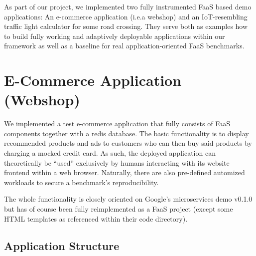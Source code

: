 \documentclass[../main.tex]{subfiles}
\begin{document}
As part of our project, we implemented two fully instrumented FaaS based demo applications:
An e-commerce application (i.e.\@ a webshop) and an IoT-resembling traffic light calculator for some road crossing.
They serve both as examples how to build fully working and adaptively deployable applications 
within our framework as well as a baseline for real application-oriented FaaS benchmarks.

\section{E-Commerce Application (Webshop)}\label{sec:webshop}

We implemented a test e-commerce application that fully consists of FaaS components together with a redis database. 
The basic functionality is to display recommended products and ads to customers 
who can then buy said products by charging a mocked credit card. 
As such, the deployed application can theoretically be ``used'' exclusively by humans 
interacting with its website frontend within a web browser.
Naturally, there are also pre-defined automized workloads to secure a benchmark's reproducibility.

The whole functionality is closely oriented on Google’s microservices demo v0.1.0\footnotemark{} 
but has of course been fully reimplemented as a FaaS project (except some HTML templates as referenced within their code directory). 

\subsection{Application Structure}\label{ssec:webshopApplicationStructure}
\end{document}
